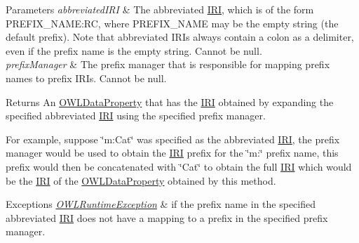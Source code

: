 \begin{DoxyParams}{Parameters}
{\em abbreviated\-I\-R\-I} & The abbreviated \hyperlink{classorg_1_1semanticweb_1_1owlapi_1_1model_1_1_i_r_i}{I\-R\-I}, which is of the form P\-R\-E\-F\-I\-X\-\_\-\-N\-A\-M\-E\-:R\-C, where P\-R\-E\-F\-I\-X\-\_\-\-N\-A\-M\-E may be the empty string (the default prefix). Note that abbreviated I\-R\-Is always contain a colon as a delimiter, even if the prefix name is the empty string. Cannot be null. \\
\hline
{\em prefix\-Manager} & The prefix manager that is responsible for mapping prefix names to prefix I\-R\-Is. Cannot be null. \\
\hline
\end{DoxyParams}
\begin{DoxyReturn}{Returns}
An \hyperlink{interfaceorg_1_1semanticweb_1_1owlapi_1_1model_1_1_o_w_l_data_property}{O\-W\-L\-Data\-Property} that has the \hyperlink{classorg_1_1semanticweb_1_1owlapi_1_1model_1_1_i_r_i}{I\-R\-I} obtained by expanding the specified abbreviated \hyperlink{classorg_1_1semanticweb_1_1owlapi_1_1model_1_1_i_r_i}{I\-R\-I} using the specified prefix manager. 
\end{DoxyReturn}
For example, suppose \char`\"{}m\-:\-Cat\char`\"{} was specified as the abbreviated \hyperlink{classorg_1_1semanticweb_1_1owlapi_1_1model_1_1_i_r_i}{I\-R\-I}, the prefix manager would be used to obtain the \hyperlink{classorg_1_1semanticweb_1_1owlapi_1_1model_1_1_i_r_i}{I\-R\-I} prefix for the \char`\"{}m\-:\char`\"{} prefix name, this prefix would then be concatenated with \char`\"{}\-Cat\char`\"{} to obtain the full \hyperlink{classorg_1_1semanticweb_1_1owlapi_1_1model_1_1_i_r_i}{I\-R\-I} which would be the \hyperlink{classorg_1_1semanticweb_1_1owlapi_1_1model_1_1_i_r_i}{I\-R\-I} of the \hyperlink{interfaceorg_1_1semanticweb_1_1owlapi_1_1model_1_1_o_w_l_data_property}{O\-W\-L\-Data\-Property} obtained by this method. 
\begin{DoxyExceptions}{Exceptions}
{\em \hyperlink{classorg_1_1semanticweb_1_1owlapi_1_1model_1_1_o_w_l_runtime_exception}{O\-W\-L\-Runtime\-Exception}} & if the prefix name in the specified abbreviated \hyperlink{classorg_1_1semanticweb_1_1owlapi_1_1model_1_1_i_r_i}{I\-R\-I} does not have a mapping to a prefix in the specified prefix manager. \\
\hline
\end{DoxyExceptions}
